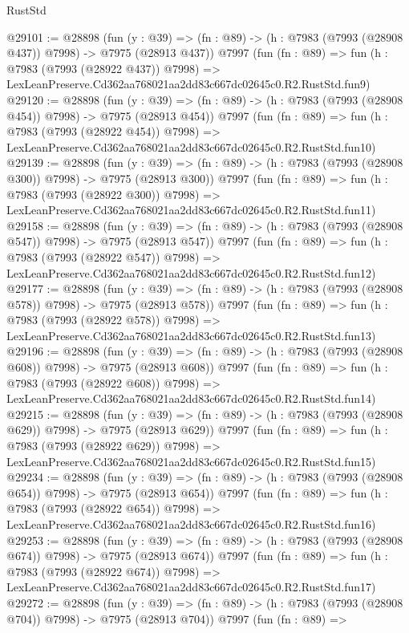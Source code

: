 \begin{lexlean}{RustStd}
\begin{coremodule}
@29101 := @28898
    (fun (y : @39) => (fn : @89) -> (h : @7983 (@7993 (@28908 @437)) @7998) -> @7975 (@28913 @437))
    @7997
    (fun (fn : @89) =>
    fun (h : @7983 (@7993 (@28922 @437)) @7998) =>
    LexLeanPreserve.Cd362aa768021aa2dd83c667dc02645c0.R2.RustStd.fun9)
@29120 := @28898
    (fun (y : @39) => (fn : @89) -> (h : @7983 (@7993 (@28908 @454)) @7998) -> @7975 (@28913 @454))
    @7997
    (fun (fn : @89) =>
    fun (h : @7983 (@7993 (@28922 @454)) @7998) =>
    LexLeanPreserve.Cd362aa768021aa2dd83c667dc02645c0.R2.RustStd.fun10)
@29139 := @28898
    (fun (y : @39) => (fn : @89) -> (h : @7983 (@7993 (@28908 @300)) @7998) -> @7975 (@28913 @300))
    @7997
    (fun (fn : @89) =>
    fun (h : @7983 (@7993 (@28922 @300)) @7998) =>
    LexLeanPreserve.Cd362aa768021aa2dd83c667dc02645c0.R2.RustStd.fun11)
@29158 := @28898
    (fun (y : @39) => (fn : @89) -> (h : @7983 (@7993 (@28908 @547)) @7998) -> @7975 (@28913 @547))
    @7997
    (fun (fn : @89) =>
    fun (h : @7983 (@7993 (@28922 @547)) @7998) =>
    LexLeanPreserve.Cd362aa768021aa2dd83c667dc02645c0.R2.RustStd.fun12)
@29177 := @28898
    (fun (y : @39) => (fn : @89) -> (h : @7983 (@7993 (@28908 @578)) @7998) -> @7975 (@28913 @578))
    @7997
    (fun (fn : @89) =>
    fun (h : @7983 (@7993 (@28922 @578)) @7998) =>
    LexLeanPreserve.Cd362aa768021aa2dd83c667dc02645c0.R2.RustStd.fun13)
@29196 := @28898
    (fun (y : @39) => (fn : @89) -> (h : @7983 (@7993 (@28908 @608)) @7998) -> @7975 (@28913 @608))
    @7997
    (fun (fn : @89) =>
    fun (h : @7983 (@7993 (@28922 @608)) @7998) =>
    LexLeanPreserve.Cd362aa768021aa2dd83c667dc02645c0.R2.RustStd.fun14)
@29215 := @28898
    (fun (y : @39) => (fn : @89) -> (h : @7983 (@7993 (@28908 @629)) @7998) -> @7975 (@28913 @629))
    @7997
    (fun (fn : @89) =>
    fun (h : @7983 (@7993 (@28922 @629)) @7998) =>
    LexLeanPreserve.Cd362aa768021aa2dd83c667dc02645c0.R2.RustStd.fun15)
@29234 := @28898
    (fun (y : @39) => (fn : @89) -> (h : @7983 (@7993 (@28908 @654)) @7998) -> @7975 (@28913 @654))
    @7997
    (fun (fn : @89) =>
    fun (h : @7983 (@7993 (@28922 @654)) @7998) =>
    LexLeanPreserve.Cd362aa768021aa2dd83c667dc02645c0.R2.RustStd.fun16)
@29253 := @28898
    (fun (y : @39) => (fn : @89) -> (h : @7983 (@7993 (@28908 @674)) @7998) -> @7975 (@28913 @674))
    @7997
    (fun (fn : @89) =>
    fun (h : @7983 (@7993 (@28922 @674)) @7998) =>
    LexLeanPreserve.Cd362aa768021aa2dd83c667dc02645c0.R2.RustStd.fun17)
@29272 := @28898
    (fun (y : @39) => (fn : @89) -> (h : @7983 (@7993 (@28908 @704)) @7998) -> @7975 (@28913 @704))
    @7997
    (fun (fn : @89) =>

\end{coremodule}
\end{lexlean}
